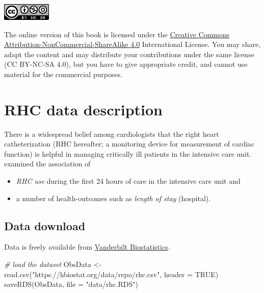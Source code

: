 \documentclass[
]{book}
\newenvironment{Shaded}{\begin{snugshade}}{\end{snugshade}}
\newcommand{\AttributeTok}[1]{\textcolor[rgb]{0.77,0.63,0.00}{#1}}
\newcommand{\CommentTok}[1]{\textcolor[rgb]{0.56,0.35,0.01}{\textit{#1}}}
\newcommand{\ConstantTok}[1]{\textcolor[rgb]{0.00,0.00,0.00}{#1}}
\newcommand{\FunctionTok}[1]{\textcolor[rgb]{0.00,0.00,0.00}{#1}}
\newcommand{\NormalTok}[1]{#1}
\newcommand{\OtherTok}[1]{\textcolor[rgb]{0.56,0.35,0.01}{#1}}
\newcommand{\StringTok}[1]{\textcolor[rgb]{0.31,0.60,0.02}{#1}}
\providecommand{\tightlist}{%
  \setlength{\itemsep}{0pt}\setlength{\parskip}{0pt}}
\begin{document}
\includegraphics[width=0.25\linewidth]{images/by-nc-sa}

The online version of this book is licensed under the \href{https://creativecommons.org/licenses/by-nc-sa/4.0/}{Creative Commons Attribution-NonCommercial-ShareAlike 4.0} International License. You may share, adapt the content and may distribute your contributions under the same license (CC BY-NC-SA 4.0), but you have to give appropriate credit, and cannot use material for the commercial purposes.

\hypertarget{rhc-data-description}{%
\chapter{RHC data description}\label{rhc-data-description}}

There is a widespread belief among cardiologists that the right heart catheterization (RHC hereafter; a monitoring device for measurement of cardiac function) is helpful in managing critically ill patients in the intensive care unit. \citet{connors1996effectiveness} examined the association of

\begin{itemize}
\tightlist
\item
  \emph{RHC use} during the first 24 hours of care in the intensive care unit and
\item
  a number of health-outcomes such as \emph{length of stay} (hospital).
\end{itemize}

\hypertarget{data-download}{%
\section{Data download}\label{data-download}}

Data is freely available from \href{https://hbiostat.org/data/}{Vanderbilt Biostatistics}.

\begin{Shaded}
\begin{Highlighting}[]
\CommentTok{\# load the dataset}
\NormalTok{ObsData }\OtherTok{\textless{}{-}} \FunctionTok{read.csv}\NormalTok{(}\StringTok{"https://hbiostat.org/data/repo/rhc.csv"}\NormalTok{, }\AttributeTok{header =} \ConstantTok{TRUE}\NormalTok{)}
\FunctionTok{saveRDS}\NormalTok{(ObsData, }\AttributeTok{file =} \StringTok{"data/rhc.RDS"}\NormalTok{)}
\end{Highlighting}
\end{Shaded}
\end{document}
